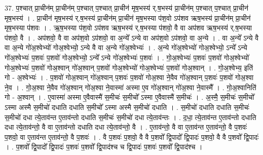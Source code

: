 \documentclass[17pt]{extarticle}
\begin{document}
37. प॒श्चात् प्रा॒चीन॑म् प्रा॒चीन॑म् प॒श्चात् प॒श्चात् प्रा॒चीन॑ मृष॒भस्य॑ र्.ष॒भस्य॑ प्रा॒चीन॑म् प॒श्चात् प॒श्चात् प्रा॒चीन॑ मृष॒भस्य॑ । . प्रा॒चीन॑ मृष॒भस्य॑ र्.ष॒भस्य॑ प्रा॒चीन॑म् प्रा॒चीन॑ मृष॒भस्या प॑श॒वो ऽप॑शव ऋष॒भस्य॑ प्रा॒चीन॑म् प्रा॒चीन॑ मृष॒भस्या प॑शवः । . ऋ॒ष॒भस्या प॑श॒वो ऽप॑शव ऋष॒भस्य॑ र्.ष॒भस्या प॑शवो॒ वै वा अप॑शव ऋष॒भस्य॑ र्.ष॒भस्या प॑शवो॒ वै । . अप॑शवो॒ वै वा अप॑श॒वो ऽप॑शवो॒ वा अ॒न्ये᳚ ऽन्ये वा अप॑श॒वो ऽप॑शवो॒ वा अ॒न्ये । . वा अ॒न्ये᳚ ऽन्ये वै वा अ॒न्ये गो॑अ॒श्वेभ्यो॑ गोअ॒श्वेभ्यो॒ ऽन्ये वै वा अ॒न्ये गो॑अ॒श्वेभ्यः॑ । . अ॒न्ये गो॑अ॒श्वेभ्यो॑ गोअ॒श्वेभ्यो॒ ऽन्ये᳚ ऽन्ये गो॑अ॒श्वेभ्यः॑ प॒शवः॑ प॒शवो॑ गोअ॒श्वेभ्यो॒ ऽन्ये᳚ ऽन्ये 
गो॑अ॒श्वेभ्यः॑ प॒शवः॑ । . गो॒अ॒श्वेभ्यः॑ प॒शवः॑ प॒शवो॑ गोअ॒श्वेभ्यो॑ गोअ॒श्वेभ्यः॑ प॒शवो॑ गोअ॒श्वान् गो॑अ॒श्वान् प॒शवो॑ 
गोअ॒श्वेभ्यो॑ गोअ॒श्वेभ्यः॑ प॒शवो॑ गोअ॒श्वान् । . गो॒अ॒श्वेभ्य॒ इति॑ गो - अ॒श्वेभ्यः॑ । . प॒शवो॑ गोअ॒श्वान् गो॑अ॒श्वान् प॒शवः॑ प॒शवो॑ गोअ॒श्वा ने॒वैव गो॑अ॒श्वान् प॒शवः॑ प॒शवो॑ गोअ॒श्वा ने॒व । . गो॒अ॒श्वा ने॒वैव गो॑अ॒श्वान् गो॑अ॒श्वा ने॒वास्मा॑ अस्मा ए॒व गो॑अ॒श्वान् गो॑अ॒श्वा ने॒वास्मै᳚ । . गो॒अ॒श्वानिति॑ गो - अ॒श्वान् । . ए॒वास्मा॑ अस्मा ए॒वैवास्मै॑ स॒मीचः॑ स॒मीचो᳚ ऽस्मा ए॒वैवास्मै॑ स॒मीचः॑ । . अ॒स्मै॒ स॒मीचः॑ स॒मीचो᳚ ऽस्मा अस्मै स॒मीचो॑ दधाति दधाति स॒मीचो᳚ ऽस्मा अस्मै स॒मीचो॑ दधाति । . स॒मीचो॑ दधाति दधाति स॒मीचः॑ स॒मीचो॑ दधा त्ये॒ताव॑न्त ए॒ताव॑न्तो दधाति स॒मीचः॑ स॒मीचो॑ दधा त्ये॒ताव॑न्तः । . द॒धा॒ त्ये॒ताव॑न्त ए॒ताव॑न्तो दधाति दधा त्ये॒ताव॑न्तो॒ वै वा ए॒ताव॑न्तो दधाति दधा त्ये॒ताव॑न्तो॒ वै । . ए॒ताव॑न्तो॒ वै वा ए॒ताव॑न्त ए॒ताव॑न्तो॒ वै प॒शवः॑ प॒शवो॒ वा ए॒ताव॑न्त ए॒ताव॑न्तो॒ वै प॒शवः॑ । . वै प॒शवः॑ प॒शवो॒ वै वै प॒शवो᳚ द्वि॒पादो᳚ द्वि॒पादः॑ प॒शवो॒ वै वै प॒शवो᳚ द्वि॒पादः॑ । . प॒शवो᳚ द्वि॒पादो᳚ द्वि॒पादः॑ प॒शवः॑ प॒शवो᳚ द्वि॒पाद॑श्च च द्वि॒पादः॑ प॒शवः॑ प॒शवो᳚ द्वि॒पाद॑श्च । \newline
\pagebreak
{}
\end{document}

